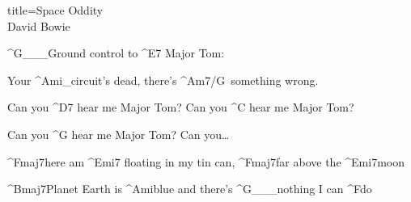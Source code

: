 \begin{song}{title=\centering Space Oddity \\\normalsize David Bowie  \vspace*{-0.3cm}}
{	^{G{\color{white}\_\_\_}}Ground control to ^{E7\,\,}Major Tom: 

	Your ^{Ami{\color{white}\_}}circuit's dead, there's ^{Am7/G\,\,\,}something wrong.

	Can you ^{D7\,\,}hear me Major Tom? Can you ^{C\,\,}hear me Major Tom? 

	Can you ^{G\,\,}hear me Major Tom? Can you\dots

	^{Fmaj7}here am ^{Emi7\,\,}floating in my tin can, ^{Fmaj7}far above the ^{Emi7}moon

	^{Bmaj7}Planet Earth is ^{Ami}blue and there's ^{G{\color{white}\_\_\_}}nothing I can ^{F}do



}
\setcounter{Slokočet}{0}
\end{song}

